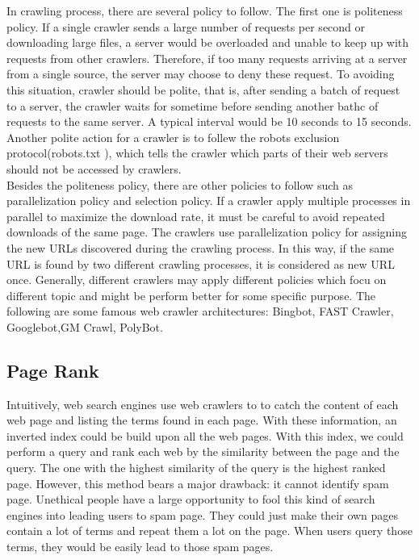 \documentclass{article}
\begin{document}
In crawling process, there are several policy to follow. The first one is politeness policy. If a single crawler sends a large number of requests per second or downloading large files, a server would be overloaded and unable to keep up with requests from other crawlers. Therefore, if too many requests arriving at a server from a single source, the server may choose to deny these request. To avoiding this situation, crawler should be polite, that is, after sending a batch of request to a server, the crawler waits for sometime before sending another bathc of requests to the same server. A typical interval would be 10 seconds to 15 seconds\cite{Baeza, Cho}. Another polite action for a crawler is to follew the robots exclusion protocol(robots.txt ), which tells the crawler which parts of their web servers should not be accessed by crawlers.\\

Besides the politeness policy, there are other policies to follow such as parallelization policy and selection policy. If a crawler apply multiple processes in parallel to maximize the download rate, it must be careful to avoid repeated downloads of the same page. The crawlers use parallelization policy for assigning the new URLs discovered during the crawling process. In this way, if the same URL is found by two different crawling processes, it is considered as new URL once. Generally, different crawlers may apply different policies which focu on different topic and might be perform better for some specific purpose. The following are some famous web crawler architectures: Bingbot, FAST Crawler\cite{Risvik}, Googlebot\cite{Brin},GM Crawl\cite{GM Crawl}, PolyBot\cite{Shkapenyuk}.
\subsection{Page Rank}
Intuitively, web search engines use web crawlers to to catch the content of each web page and listing the terms found in each page. With these information, an inverted index could be build upon all the web pages. With this index, we could perform a query and rank each web by the similarity between the page and the query. The one with the highest similarity of the query is the highest ranked page. However, this method bears a major drawback: it cannot identify spam page. Unethical people have a large opportunity to fool this kind of search engines into leading users to spam page. They could just make their own pages contain a lot of terms and repeat them a lot on the page. When users query those terms, they would be easily lead to those spam pages. \\
\end{document}
